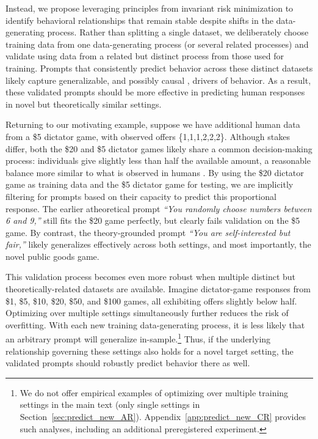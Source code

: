 \documentclass[11pt]{article}
\theoremstyle{definition}
\newcommand{\persona}{prompt}
\newcommand{\Persona}{Prompt}
\begin{document}
Instead, we propose leveraging principles from invariant risk minimization \citep{arjovsky2020invariant} to identify behavioral relationships that remain stable despite shifts in the data-generating process. 
Rather than splitting a single dataset, we deliberately choose training data from one data-generating process (or several related processes) and validate using data from a related but distinct process from those used for training.
\Persona{s} that consistently predict behavior across these distinct datasets likely capture generalizable, and possibly causal \citep{Peters2016invariant, Heinze2018invariant}, drivers of behavior.
As a result, these validated \persona{s} should be more effective in predicting human responses in novel but theoretically similar settings.

Returning to our motivating example, suppose we have additional human data from a \$5 dictator game, with observed offers \{1,1,1,2,2,2\}.
Although stakes differ, both the \$20 and \$5 dictator games likely share a common decision-making process: individuals give slightly less than half the available amount, a reasonable balance more similar to what is observed in humans \citep{Henrich2001InSearch}.
By using the  \$20 dictator game as training data and the \$5 dictator game for testing, we are implicitly filtering for \persona{s} based on their capacity to predict this proportional response.
The earlier atheoretical prompt \emph{``You randomly choose numbers between 6 and 9,''} still fits the \$20 game perfectly, but clearly fails validation on the \$5 game.
By contrast, the theory-grounded \persona{} \emph{``You are self-interested but fair,''} likely generalizes effectively across both settings, and most importantly, the novel public goods game.

This validation process becomes even more robust when multiple distinct but theoretically-related datasets are available. 
Imagine dictator-game responses from \$1, \$5, \$10, \$20, \$50, and \$100 games, all exhibiting offers slightly below half.
Optimizing over multiple settings simultaneously further reduces the risk of overfitting. 
With each new training data-generating process, it is less likely that an arbitrary prompt will generalize in-sample.\footnote{We do not offer empirical examples of optimizing over multiple training settings in the main text (only single settings in Section~\ref{sec:predict_new_AR}).
Appendix~\ref{app:predict_new_CR} provides such analyses, including an additional preregistered experiment.}
Thus, if the underlying relationship governing these settings also holds for a novel target setting, the validated \persona{s} should robustly predict behavior there as well.
\end{document}
